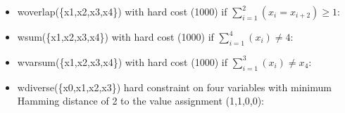 \documentclass[letterpaper,10pt,openany,oneside,english]{sphinxmanual}
\begin{document}
\begin{fulllineitems}
\begin{itemize}
\item {} 
\sphinxAtStartPar
woverlap(\{x1,x2,x3,x4\}) with hard cost (1000) if \(\sum_{i=1}^2(x_i = x_{i+2}) \geq 1\):
\begin{sphinxVerbatim}[commandchars=\\\{\}]
          
\end{sphinxVerbatim}


\item {} 
\sphinxAtStartPar
wsum(\{x1,x2,x3,x4\}) with hard cost (1000) if \(\sum_{i=1}^4(x_i) \neq 4\):
\begin{sphinxVerbatim}[commandchars=\\\{\}]
           
\end{sphinxVerbatim}


\item {} 
\sphinxAtStartPar
wvarsum(\{x1,x2,x3,x4\}) with hard cost (1000) if \(\sum_{i=1}^3(x_i) \neq x_4\):
\begin{sphinxVerbatim}[commandchars=\\\{\}]
          
\end{sphinxVerbatim}


\item {} 
\sphinxAtStartPar
wdiverse(\{x0,x1,x2,x3\}) hard constraint on four variables with minimum Hamming distance of 2 to the value assignment (1,1,0,0):
\begin{sphinxVerbatim}[commandchars=\\\{\}]
            
\end{sphinxVerbatim}


\end{itemize}



\end{fulllineitems}
\end{document}
